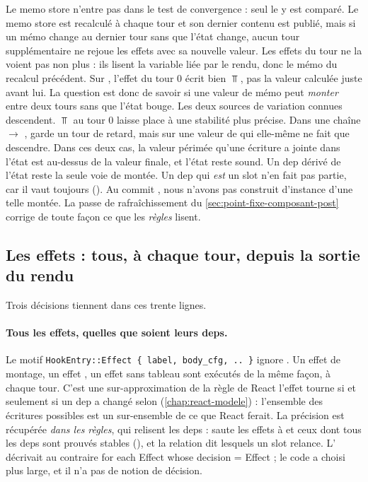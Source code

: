 \begin{piege}
Le memo store n'entre pas dans le test de convergence : seul le
 y est comparé. Le memo store est recalculé à chaque tour et
son dernier contenu est publié, mais si un mémo change au dernier tour sans
que l'état change, aucun tour supplémentaire ne rejoue les effets avec sa
nouvelle valeur. Les effets du tour ne la voient pas non plus : ils lisent
la variable liée par le rendu, donc le mémo du recalcul précédent. Sur
, l'effet du tour 0 écrit bien $\Top$, pas la valeur
 calculée juste avant lui. La question est donc de savoir si
une valeur de mémo peut \emph{monter} entre deux tours sans que l'état
bouge. Les deux sources de variation connues descendent. $\Top$ au tour 0
laisse place à une stabilité plus précise. Dans une chaîne 
$\to$ ,  garde un tour de retard, mais sur une valeur de
 qui elle-même ne fait que descendre. Dans ces deux cas, la valeur
périmée qu'une écriture a jointe dans l'état est au-dessus de la valeur
finale, et l'état reste sound. Un dep dérivé de l'état reste la seule voie de
montée. Un dep qui \emph{est} un slot n'en fait pas partie, car il vaut
toujours  ().
Au commit \snapshotCommit, nous n'avons pas construit d'instance d'une telle
montée. La passe de rafraîchissement du \cref{sec:point-fixe-composant-post}
corrige de toute façon ce que les \emph{règles} lisent.
\end{piege}

\subsection{Les effets : tous, à chaque tour, depuis la sortie du rendu}
\label{sec:point-fixe-composant-effets}


Trois décisions tiennent dans ces trente lignes.

\paragraph{Tous les effets, quelles que soient leurs deps.} Le motif
\texttt{HookEntry::Effect \{ label, body\_cfg, .. \}} ignore . Un effet
\code{[]} de montage, un effet \code{[count]}, un effet sans tableau sont
exécutés de la même façon, à chaque tour. C'est une sur-approximation de la
règle de React \og l'effet tourne si et seulement si un dep a changé selon
\fg{} (\cref{chap:react-modele}) : l'ensemble des écritures
possibles est un sur-ensemble de ce que React ferait. La précision est
récupérée \emph{dans les règles}, qui relisent les deps : 
saute les effets à \code{[]} et ceux dont tous les deps sont prouvés stables
(), et la relation
 dit lesquels un slot relance. L' décrivait
au contraire \og for each Effect whose decision = Effect\fg{} ; le code a
choisi plus large, et il n'a pas de notion de décision.

